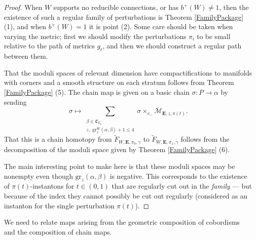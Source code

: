 \documentclass[10pt,a4paper]{amsart}
\theoremstyle{definition}
\theoremstyle{remark}
\numberwithin{figure}{qchap}
\begin{document}
\begin{proof}When $W$ supports no reducible connections, or has $b^+(W) \neq 1$, then the existence of such a regular family of perturbations is Theorem \ref{FamilyPackage} (1), and when $b^+(W) = 1$ it is point (2). Some care should be taken when varying the metric; first we should modify the perturbations $\pi_i$ to be small relative to the path of metrics $g_t$, and then we should construct a regular path between them.

That the moduli spaces of relevant dimension have compactifications to manifolds with corners and a smooth structure on each stratum follows from Theorem \ref{FamilyPackage} (5). The chain map is given on a basic chain $\sigma: P \to \alpha$ by sending $$\sigma \mapsto \sum_{\substack{\beta \in \mathfrak C_{Y_2}\\ z, \text{ gr}^W_z(\alpha, \beta) + 1 \leq 4}} \sigma \times_{e_-} \overline{\mathcal M}_{\mathbf{E}, z,\pi(t)}.$$ That this is a chain homotopy from $\widetilde F_{W,\mathbf{E}, \pi_0, \gamma}$ to $\widetilde F_{W,\mathbf{E}, \pi_1, \gamma}$ follows from the decomposition of the moduli space given by Theorem \ref{FamilyPackage} (6).

The main interesting point to make here is that these moduli spaces may be nonempty even though $\text{gr}_z(\alpha, \beta)$ is negative. This corresponds to the existence of $\pi(t)$-instantons for $t \in (0,1)$ that are regularly cut out in the \textit{family} --- but because of the index they cannot possibly be cut out regularly (considered as an instanton for the single perturbation $\pi(t)$).
\end{proof}

We need to relate maps arising from the geometric composition of cobordisms and the composition of chain maps.
\end{document}
